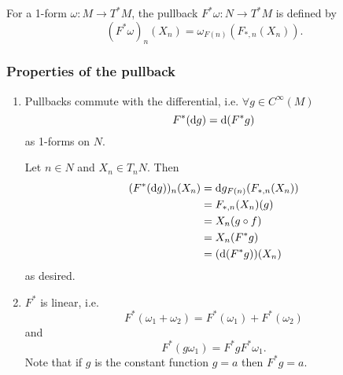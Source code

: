 For a 1-form $\omega: M \to T^\ast M$, the pullback
$F^\ast \omega : N \to T^\ast M$ is defined by
$$
(F^\ast \omega)_n(X_n) = \omega_{F(n)}(F_{\ast, n} (X_n)).
$$

\subsubsection{Properties of the pullback}
\begin{enumerate}
  \item{
    Pullbacks commute with the differential, i.e.
    $\forall g \in C^\infty(M)$
    $$
    F^\ast(\mathop{}\!\mathrm{d} g) = \mathop{}\!\mathrm{d}(F^\ast g)
    $$
    as 1-forms on $N$.

    Let $n \in N$ and $X_n \in T_n N$. Then
    \begin{align*}
       (F^\ast(\mathop{}\!\mathrm{d} g))_n(X_n)
    &= \mathop{}\!\mathrm{d} g_{F(n)}(F_{\ast, n}(X_n)) \\
    &= F_{\ast, n}(X_n)(g) \\
    &= X_n(g \circ f) \\
    &= X_n(F^\ast g) \\
    &= (\mathop{}\!\mathrm{d} (F^\ast g))(X_n)
    \end{align*}
    as desired.
  }
  \item{
    $F^\ast$ is linear, i.e.
    $$
      F^\ast(\omega_1 + \omega_2)
    = F^\ast(\omega_1) + F^\ast(\omega_2)
    $$
    and
    $$
    F^\ast(g \omega_1) = F^\ast g F^\ast \omega_1.
    $$
    Note that if $g$ is the constant function
    $g = a$ then $F^\ast g = a$.

}
\end{enumerate}
